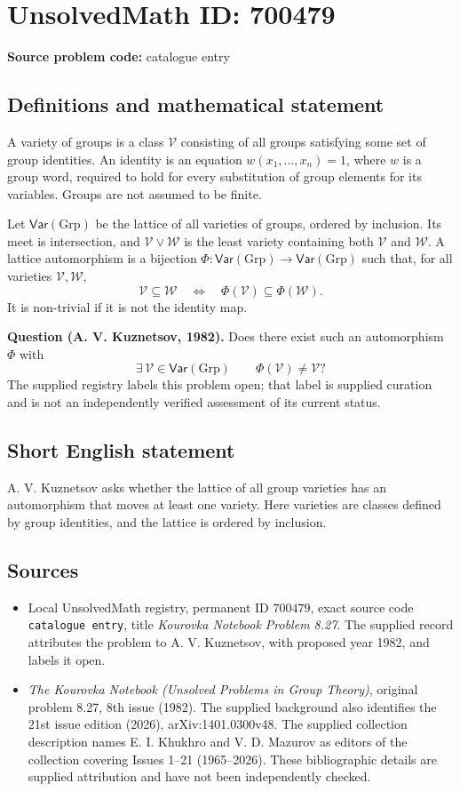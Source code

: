 \documentclass[11pt]{article}
\begin{document}
\section*{UnsolvedMath ID: 700479}
\textbf{Source problem code:} catalogue entry
\subsection{Definitions and mathematical statement}
A variety of groups is a class \(\mathcal V\) consisting of all groups satisfying some set of group identities. An identity is an equation \(w(x_1,\ldots,x_n)=1\), where \(w\) is a group word, required to hold for every substitution of group elements for its variables. Groups are not assumed to be finite.

Let \(\mathsf{Var}(\mathrm{Grp})\) be the lattice of all varieties of groups, ordered by inclusion. Its meet is intersection, and \(\mathcal V\vee\mathcal W\) is the least variety containing both \(\mathcal V\) and \(\mathcal W\). A lattice automorphism is a bijection \(\Phi\colon\mathsf{Var}(\mathrm{Grp})\to\mathsf{Var}(\mathrm{Grp})\) such that, for all varieties \(\mathcal V,\mathcal W\),
\[
\mathcal V\subseteq\mathcal W
\quad\Longleftrightarrow\quad
\Phi(\mathcal V)\subseteq\Phi(\mathcal W).
\]
It is non-trivial if it is not the identity map.

\textbf{Question (A. V. Kuznetsov, 1982).} Does there exist such an automorphism \(\Phi\) with
\[
\exists\,\mathcal V\in\mathsf{Var}(\mathrm{Grp})\qquad
\Phi(\mathcal V)\ne\mathcal V?
\]
The supplied registry labels this problem open; that label is supplied curation and is not an independently verified assessment of its current status.
\subsection{Short English statement}
A. V. Kuznetsov asks whether the lattice of all group varieties has an automorphism that moves at least one variety. Here varieties are classes defined by group identities, and the lattice is ordered by inclusion.
\subsection{Sources}
\begin{itemize}
\item Local UnsolvedMath registry, permanent ID \(700479\), exact source code \texttt{catalogue entry}, title \emph{Kourovka Notebook Problem 8.27}. The supplied record attributes the problem to A. V. Kuznetsov, with proposed year 1982, and labels it open.
\item \emph{The Kourovka Notebook (Unsolved Problems in Group Theory)}, original problem 8.27, 8th issue (1982). The supplied background also identifies the 21st issue edition (2026), arXiv:1401.0300v48. The supplied collection description names E. I. Khukhro and V. D. Mazurov as editors of the collection covering Issues 1--21 (1965--2026). These bibliographic details are supplied attribution and have not been independently checked.
\end{itemize}
\end{document}
